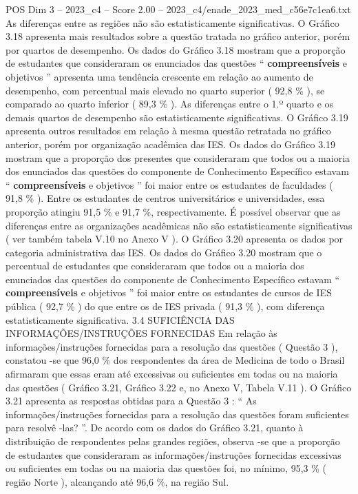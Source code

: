 \begin{textsample}{POS Dim 3 – 2023\_c4 – Score 2.00 – 2023\_c4/enade\_2023\_med\_c56e7c1ea6.txt}
As diferenças entre as regiões não são estatisticamente significativas.
O Gráfico 3.18 apresenta mais resultados sobre a questão tratada no gráfico anterior, porém por quartos de desempenho.
Os dados do Gráfico 3.18 mostram que a proporção de estudantes que consideraram os enunciados das questões “ \textbf{compreensíveis} e objetivos ” apresenta uma tendência crescente em relação ao aumento de desempenho, com percentual mais elevado no quarto superior ( 92,8 \% ), se comparado ao quarto inferior ( 89,3 \% ).
As diferenças entre o 1.º quarto e os demais quartos de desempenho são estatisticamente significativas.
O Gráfico 3.19 apresenta outros resultados em relação à mesma questão retratada no gráfico anterior, porém por organização acadêmica das IES.
Os dados do Gráfico 3.19 mostram que a proporção dos presentes que consideraram que todos ou a maioria dos enunciados das questões do componente de Conhecimento Específico estavam “ \textbf{compreensíveis} e objetivos ” foi maior entre os estudantes de faculdades ( 91,8 \% ).
Entre os estudantes de centros universitários e universidades, essa proporção atingiu 91,5 \% e 91,7 \%, respectivamente.
É possível observar que as diferenças entre as organizações acadêmicas não são estatisticamente significativas ( ver também tabela V.10 no Anexo V ).
O Gráfico 3.20 apresenta os dados por categoria administrativa das IES.
Os dados do Gráfico 3.20 mostram que o percentual de estudantes que consideraram que todos ou a maioria dos enunciados das questões do componente de Conhecimento Específico estavam “ \textbf{compreensíveis} e objetivos ” foi maior entre os estudantes de cursos de IES pública ( 92,7 \% ) do que entre os de IES privada ( 91,3 \% ), com diferença estatisticamente significativa. 3.4 SUFICIÊNCIA DAS INFORMAÇÕES/INSTRUÇÕES FORNECIDAS Em relação às informações/instruções fornecidas para a resolução das questões ( Questão 3 ), constatou -se que 96,0 \% dos respondentes da área de Medicina de todo o Brasil afirmaram que essas eram até excessivas ou suficientes em todas ou na maioria das questões ( Gráfico 3.21, Gráfico 3.22 e, no Anexo V, Tabela V.11 ).
O Gráfico 3.21 apresenta as respostas obtidas para a Questão 3 : “ As informações/instruções fornecidas para a resolução das questões foram suficientes para resolvê -las? ”.
De acordo com os dados do Gráfico 3.21, quanto à distribuição de respondentes pelas grandes regiões, observa -se que a proporção de estudantes que consideraram as informações/instruções fornecidas excessivas ou suficientes em todas ou na maioria das questões foi, no mínimo, 95,3 \% ( região Norte ), alcançando até 96,6 \%, na região Sul.

\end{textsample}

